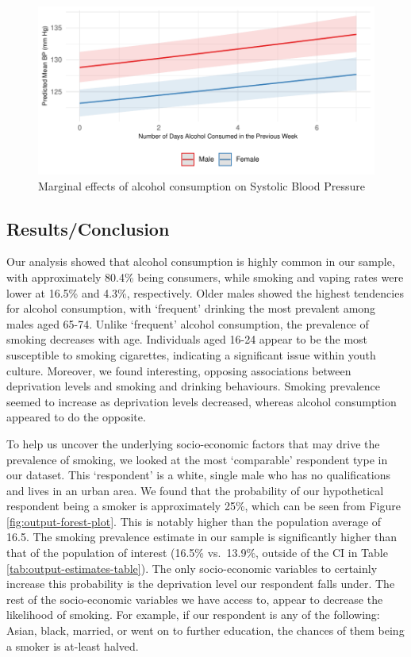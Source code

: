 \documentclass[
  11pt,
  twocolumn]{article}
\begin{document}
\begin{figure}[H]
\includegraphics{Coursework_files/figure-latex/output-effect-plots-alc-1} \caption{Marginal effects of alcohol consumption on Systolic Blood Pressure}\label{fig:output-effect-plots-alc}
\end{figure}

\hypertarget{resultsconclusion}{%
\subsection{Results/Conclusion}\label{resultsconclusion}}

Our analysis showed that alcohol consumption is highly common in our
sample, with approximately 80.4\% being consumers, while smoking and
vaping rates were lower at 16.5\% and 4.3\%, respectively. Older males
showed the highest tendencies for alcohol consumption, with `frequent'
drinking the most prevalent among males aged 65-74. Unlike `frequent'
alcohol consumption, the prevalence of smoking decreases with age.
Individuals aged 16-24 appear to be the most susceptible to smoking
cigarettes, indicating a significant issue within youth culture.
Moreover, we found interesting, opposing associations between
deprivation levels and smoking and drinking behaviours. Smoking
prevalence seemed to increase as deprivation levels decreased, whereas
alcohol consumption appeared to do the opposite.

To help us uncover the underlying socio-economic factors that may drive
the prevalence of smoking, we looked at the most `comparable' respondent
type in our dataset. This `respondent' is a white, single male who has
no qualifications and lives in an urban area. We found that the
probability of our hypothetical respondent being a smoker is
approximately 25\%, which can be seen from Figure
\ref{fig:output-forest-plot}. This is notably higher than the population
average of 16.5. The smoking prevalence estimate in our sample is
significantly higher than that of the population of interest (16.5\%
vs.~13.9\%, outside of the CI in Table
\ref{tab:output-estimates-table}). The only socio-economic variables to
certainly increase this probability is the deprivation level our
respondent falls under. The rest of the socio-economic variables we have
access to, appear to decrease the likelihood of smoking. For example, if
our respondent is any of the following: Asian, black, married, or went
on to further education, the chances of them being a smoker is at-least
halved.
\end{document}
